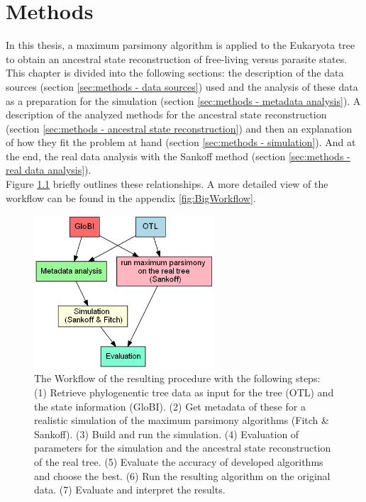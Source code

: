 \chapter{Methods}
  In this thesis, a maximum parsimony algorithm is applied to the Eukaryota tree to obtain an 
    ancestral state reconstruction of free-living versus parasite states. \\
  This chapter is divided into the following sections: the description of the data sources 
    (section \ref{sec:methods - data sources}) used and the analysis of these data as a preparation 
    for the simulation (section \ref{sec:methods - metadata analysis}). A description of the 
    analyzed methods for the ancestral state reconstruction (section 
    \ref{sec:methods - ancestral state reconstruction}) and then an explanation of how they fit the 
    problem at hand (section \ref{sec:methods - simulation}). And at the end, the real data analysis 
    with the Sankoff method (section \ref{sec:methods - real data analysis}). \\
  Figure \ref{fig:workflow} briefly outlines these relationships. A more detailed view of the 
    workflow can be found in the appendix \ref{fig:BigWorkflow}.
  \begin{figure}[h!]
    \centering
    \includegraphics[width=0.6\textwidth]{Figures/Workflow-overview.png}
    \caption{The Workflow of the resulting procedure with the following steps: \\
      (1) Retrieve phylogenentic tree data as input for the tree (OTL) and the state information (GloBI).
      (2) Get metadata of these for a realistic simulation of the maximum parsimony algorithms (Fitch \& Sankoff).
      (3) Build and run the simulation.
      (4) Evaluation of parameters for the simulation and the ancestral state reconstruction of the real tree.
      (5) Evaluate the accuracy of developed algorithms and choose the best.
      (6) Run the resulting algorithm on the original data.
      (7) Evaluate and interpret the results. %
    }
    \label{fig:workflow}
  \end{figure}
  
